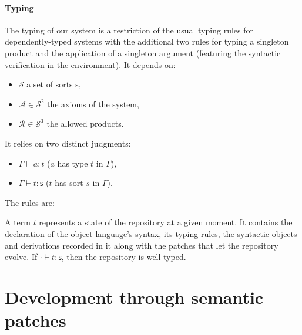 \documentclass{article}
\newcommand{\sort}{\textsf{s}}
\newcommand{\subst}[2]{\{#1/#2\}}
\begin{document}
\paragraph{Typing} The typing of our system is a restriction of the
usual typing rules for dependently-typed systems with the additional
two rules for typing a singleton product and the application of a
singleton argument (featuring the syntactic verification in the
environment). It depends on: 
\begin{itemize}
  \item$\mathcal S$ a set of sorts \sort,
  \item$\mathcal A \in \mathcal S^2$ the axioms of the system,
  \item$\mathcal R \in \mathcal S^3$ the allowed products.
\end{itemize}
It relies on two distinct judgments:
\begin{itemize}
\item $\Gamma\vdash a : t$ ($a$ has type $t$ in $\Gamma$),
\item $\Gamma\vdash t : \sort$ ($t$ has sort $s$ in $\Gamma$).
\end{itemize}
The rules are:

A term $t$ represents a state of the repository at a given moment. It
contains the declaration of the object language's syntax, its typing
rules, the syntactic objects and derivations recorded in it along with
the patches that let the repository evolve. If $\cdot\vdash t:\sort$,
then the repository is well-typed.

\section{Development through semantic patches}
\label{devel}
\end{document}
